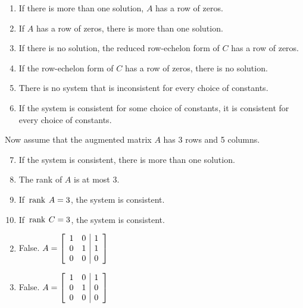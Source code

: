 \begin{multicols}{2}
\begin{ex}
\begin{enumerate}[label={\alph*.}]
\item If there is more than one solution, $A$ has a row of zeros.

\item If $A$ has a row of zeros, there is more than one solution.

\item If there is no solution, the reduced row-echelon form of $C$ has a row of zeros.

\item If the row-echelon form of $C$ has a row of zeros, there is no solution.

\item There is no system that is inconsistent for every choice of constants.

\item If the system is consistent for some choice of constants, it is consistent for every choice of constants.

\end{enumerate}

\noindent Now assume that the augmented matrix $A$ has 3 rows and 5 columns.

\begin{enumerate}[label={\alph*.}]
\setcounter{enumi}{6}
\item If the system is consistent, there is more than one solution.

\item The rank of $A$ is at most $3$.

\item If $\thinspace\operatorname{rank\medspace} A = 3$, the system is consistent.

\item If $\thinspace\operatorname{rank\medspace} C = 3$, the system is consistent.

\end{enumerate}
\begin{sol}
\begin{enumerate}[label={\alph*.}]
\setcounter{enumi}{1}
\item  False. 
$A = \left[ \begin{array}{rr|r}
	1 & 0 & 1 \\
	0 & 1 & 1 \\
	0 & 0 & 0	
\end{array} \right]$

\setcounter{enumi}{3}
\item  False. 
$A = \left[ \begin{array}{rr|r}
	1 & 0 & 1 \\
	0 & 1 & 0 \\
	0 & 0 & 0	
\end{array} \right]$


\end{enumerate}
\end{sol}
\end{ex}
\end{multicols}
